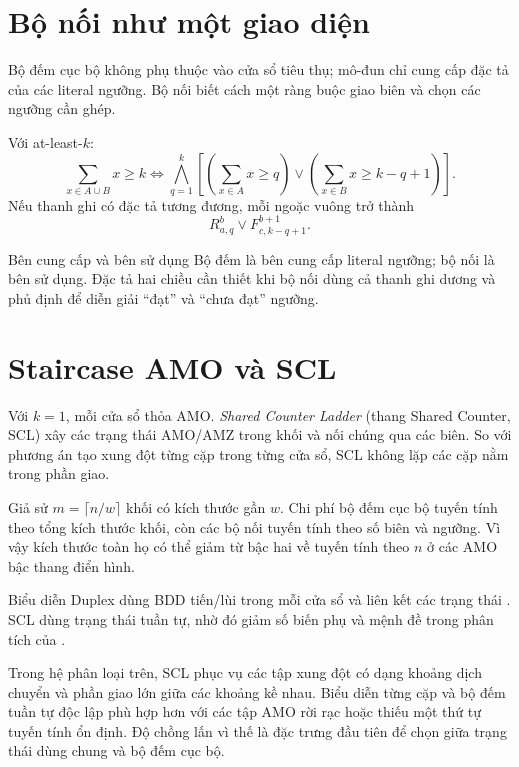 \section{Bộ nối như một giao diện}

Bộ đếm cục bộ không phụ thuộc vào cửa sổ tiêu thụ; mô-đun chỉ cung cấp đặc tả của các
literal ngưỡng. Bộ nối biết cách một ràng buộc giao biên và chọn các ngưỡng cần
ghép.

Với at-least-\(k\):
\[
  \sum_{x\in A\cup B}x\ge k
\iff
  \bigwedge_{q=1}^{k}
  \left[
    \left(\sum_{x\in A}x\ge q\right)
    \lor
    \left(\sum_{x\in B}x\ge k-q+1\right)
  \right].
\]
Nếu thanh ghi có đặc tả tương đương, mỗi ngoặc vuông trở thành
\[
  R^b_{a,q}\lor F^{b+1}_{c,k-q+1}.
\]

\begin{designrule}{Bên cung cấp và bên sử dụng}
Bộ đếm là bên cung cấp literal ngưỡng; bộ nối là bên sử dụng. Đặc tả hai
chiều cần thiết khi bộ nối dùng cả thanh ghi dương và phủ định để diễn giải
``đạt'' và ``chưa đạt'' ngưỡng.
\end{designrule}

\section{Staircase AMO và SCL}

Với \(k=1\), mỗi cửa sổ thỏa AMO. \emph{Shared Counter Ladder}
(thang Shared Counter, SCL) xây các trạng thái AMO/AMZ trong khối và
nối chúng qua các biên. So với phương án tạo xung đột từng cặp trong từng cửa sổ,
SCL không lặp các cặp nằm trong phần giao.

Giả sử \(m=\lceil n/w\rceil\) khối có kích thước gần \(w\). Chi phí bộ đếm cục
bộ tuyến tính theo tổng kích thước khối, còn các bộ nối tuyến tính theo số biên và
ngưỡng. Vì vậy kích thước toàn họ có thể giảm từ bậc hai về tuyến tính theo
\(n\) ở các AMO bậc thang điển hình.

Biểu diễn Duplex dùng BDD tiến/lùi trong mỗi cửa sổ và liên kết các trạng thái
\parencite{fazekas2020duplex}. SCL dùng trạng thái tuần tự, nhờ đó giảm số
biến phụ và mệnh đề trong phân tích của
\textcite{truong2025scamo}.

Trong hệ phân loại trên, SCL phục vụ các tập xung đột có dạng khoảng dịch
chuyển và phần giao lớn giữa các khoảng kề nhau. Biểu diễn từng cặp và bộ đếm tuần
tự độc lập phù hợp hơn với các tập AMO rời rạc hoặc thiếu một thứ tự tuyến tính
ổn định. Độ chồng lấn vì thế là đặc trưng đầu tiên để chọn giữa trạng thái dùng
chung và bộ đếm cục bộ.

